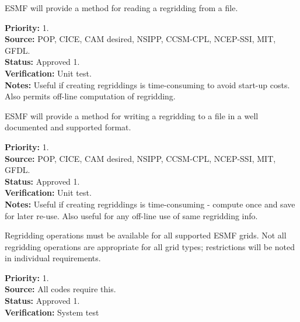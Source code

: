 
ESMF will provide a method for reading a regridding from a file. 

\begin{reqlist}
{\bf Priority:} 1. \\
{\bf Source:} POP, CICE, CAM desired, NSIPP, CCSM-CPL, NCEP-SSI, MIT, GFDL. \\
{\bf Status:} Approved 1. \\
{\bf Verification:} Unit test. \\
{\bf Notes:} Useful if creating regriddings is time-consuming to avoid
             start-up costs. Also permits off-line computation of regridding.
\end{reqlist}


ESMF will provide a method for writing a regridding to a file in a well
documented and supported format. 

\begin{reqlist}
{\bf Priority:} 1. \\
{\bf Source:} POP, CICE, CAM desired, NSIPP, CCSM-CPL, NCEP-SSI, MIT, GFDL. \\
{\bf Status:} Approved 1. \\
{\bf Verification:} Unit test. \\
{\bf Notes:} Useful if creating regriddings is time-consuming - compute once
             and save for later re-use.  Also useful for any off-line
             use of same regridding info.
\end{reqlist}


Regridding operations must be available for all supported ESMF grids.
Not all regridding operations are appropriate for
all grid types; restrictions will be noted in individual requirements.

\begin{reqlist}
{\bf Priority:} 1. \\
{\bf Source:} All codes require this. \\
{\bf Status:} Approved 1. \\
{\bf Verification:} System test 
\end{reqlist}


